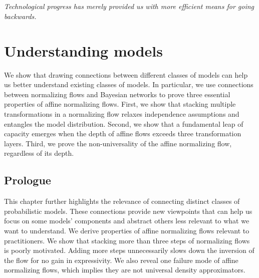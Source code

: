 \thispagestyle{empty}
\section*{}

\vfill

{
\textit{\justify
   Technological progress has merely provided us with more efficient means for going backwards.}

  \par\bigskip
  \par%
}

\vfill


\chapter{Understanding models}\label{ch:04}

\begin{chapter_outline}

  We show that drawing connections between different classes of models can help us better understand existing classes of models.
  In particular, we use connections between normalizing flows and Bayesian networks to prove three essential properties of affine normalizing flows.
  First, we show that stacking multiple transformations in a normalizing flow relaxes independence assumptions and entangles the model distribution.
  Second, we show that a fundamental leap of capacity emerges when the depth of affine flows exceeds three transformation layers.
  Third, we prove the non-universality of the affine normalizing flow, regardless of its depth.
\end{chapter_outline}

\section{Prologue}
This chapter further highlights the relevance of connecting distinct classes of probabilistic models. These connections provide new viewpoints that can help us focus on some models' components and abstract others less relevant to what we want to understand. We derive properties of affine normalizing flows relevant to practitioners. We show that stacking more than three steps of normalizing flows is poorly motivated. Adding more steps unnecessarily slows down the inversion of the flow for no gain in expressivity. We also reveal one failure mode of affine normalizing flows, which implies they are not universal density approximators.

